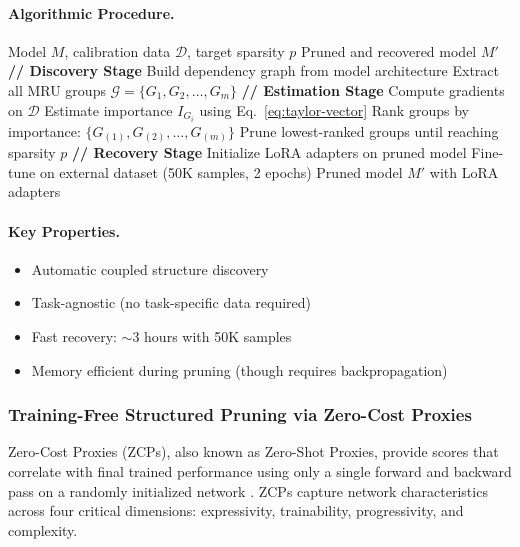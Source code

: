 \paragraph{Algorithmic Procedure.}
\begin{algorithm}[h]
	\caption{LLM-Pruner}
	\begin{algorithmic}[1]
		\REQUIRE Model $M$, calibration data $\mathcal{D}$, target sparsity $p$
		\ENSURE Pruned and recovered model $M'$
		\STATE \textbf{// Discovery Stage}
		\STATE Build dependency graph from model architecture
		\STATE Extract all MRU groups $\mathcal{G} = \{G_1, G_2, \ldots, G_m\}$
		\STATE \textbf{// Estimation Stage}
		\STATE Compute gradients on $\mathcal{D}$
		\STATE Estimate importance $I_{G_i}$ using Eq.~\eqref{eq:taylor-vector}
		\ENDFOR
		\STATE Rank groups by importance: $\{G_{(1)}, G_{(2)}, \ldots, G_{(m)}\}$
		\STATE Prune lowest-ranked groups until reaching sparsity $p$
		\STATE \textbf{// Recovery Stage}
		\STATE Initialize LoRA adapters on pruned model
		\STATE Fine-tune on external dataset (50K samples, 2 epochs)
		\RETURN Pruned model $M'$ with LoRA adapters
	\end{algorithmic}
\end{algorithm}

\paragraph{Key Properties.}
\begin{itemize}[nosep]
	\item Automatic coupled structure discovery
	\item Task-agnostic (no task-specific data required)
	\item Fast recovery: $\sim$3 hours with 50K samples
	\item Memory efficient during pruning (though requires backpropagation)
\end{itemize}

\subsubsection{Training-Free Structured Pruning via Zero-Cost Proxies}

Zero-Cost Proxies (ZCPs), also known as Zero-Shot Proxies, provide scores that correlate with final trained performance using only a single forward and backward pass on a randomly initialized network \cite{abdelfattah2021zero,li2023zeroshot}. ZCPs capture network characteristics across four critical dimensions: expressivity, trainability, progressivity, and complexity.

